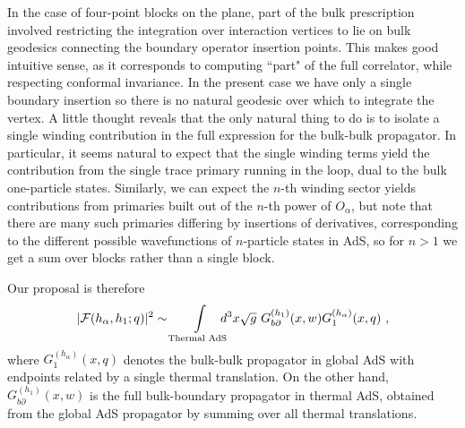 \documentclass[12pt]{article}
\def\p{\partial}
\begin{document}
In the case of four-point blocks on the plane, part of the bulk prescription involved restricting the integration over interaction vertices to lie on bulk geodesics connecting the boundary operator insertion points.  This makes good intuitive sense, as it corresponds to computing ``part" of the full correlator, while respecting conformal invariance.  In the present case we have only a single boundary insertion so there is no natural geodesic over which to integrate the vertex.  A little thought reveals that the only natural thing to do is to isolate a single winding contribution in the full expression for the bulk-bulk propagator.  In particular, it seems natural to expect that the single winding terms yield the contribution from the single trace primary running in the loop, dual to the bulk one-particle states.   Similarly, we can expect the $n$-th winding sector yields contributions from primaries built out of the $n$-th power of $O_\alpha$, but note that there are many such primaries differing by insertions of derivatives, corresponding to the different possible wavefunctions of $n$-particle states in AdS, so for $n>1$ we get a sum over blocks rather than a single block.

Our proposal is therefore
%
\begin{equation}
\label{blkprop}  |\mathcal{F}(h_{\alpha},h_1;q)|^2 \sim  \int\displaylimits_\text{Thermal AdS} \mkern-16mu d^3x \sqrt{g} ~G_{b\p}^{(h_1)}(x,w)G_{1}^{(h_\alpha)}(x,q)~,
\end{equation}
%
where $G_{1}^{(h_\alpha)}(x,q)$ denotes the bulk-bulk propagator in global AdS with endpoints related by a single thermal translation.  On the other hand, $G_{b\p}^{(h_1)}(x,w)$ is the full bulk-boundary propagator in thermal AdS, obtained from the global AdS propagator by summing over all thermal translations.
\end{document}
